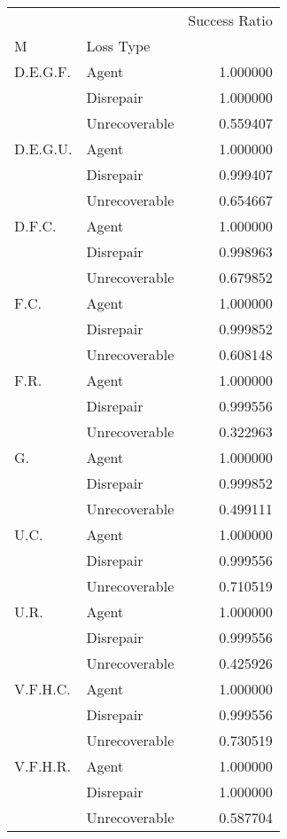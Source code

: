 \begin{tabular}{llr}
\toprule
         &               &  Success Ratio \\
M & Loss Type &                \\
\midrule
D.E.G.F. & Agent &       1.000000 \\
         & Disrepair &       1.000000 \\
         & Unrecoverable &       0.559407 \\
D.E.G.U. & Agent &       1.000000 \\
         & Disrepair &       0.999407 \\
         & Unrecoverable &       0.654667 \\
D.F.C. & Agent &       1.000000 \\
         & Disrepair &       0.998963 \\
         & Unrecoverable &       0.679852 \\
F.C. & Agent &       1.000000 \\
         & Disrepair &       0.999852 \\
         & Unrecoverable &       0.608148 \\
F.R. & Agent &       1.000000 \\
         & Disrepair &       0.999556 \\
         & Unrecoverable &       0.322963 \\
G. & Agent &       1.000000 \\
         & Disrepair &       0.999852 \\
         & Unrecoverable &       0.499111 \\
U.C. & Agent &       1.000000 \\
         & Disrepair &       0.999556 \\
         & Unrecoverable &       0.710519 \\
U.R. & Agent &       1.000000 \\
         & Disrepair &       0.999556 \\
         & Unrecoverable &       0.425926 \\
V.F.H.C. & Agent &       1.000000 \\
         & Disrepair &       0.999556 \\
         & Unrecoverable &       0.730519 \\
V.F.H.R. & Agent &       1.000000 \\
         & Disrepair &       1.000000 \\
         & Unrecoverable &       0.587704 \\
\bottomrule
\end{tabular}
